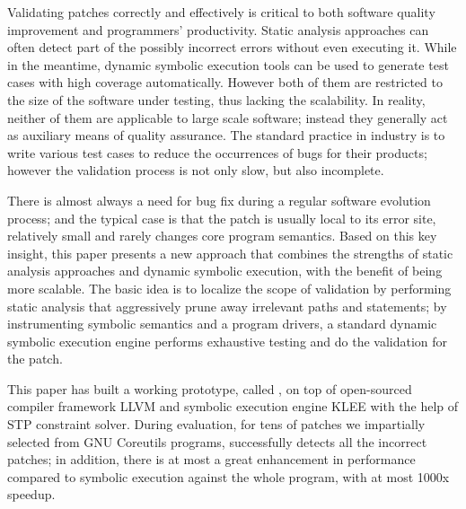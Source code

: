 \begin{englishabstract}
Validating patches correctly and effectively is critical to both software quality improvement and programmers' productivity. Static analysis approaches can often detect part of the possibly incorrect errors without even executing it. While in the meantime, dynamic symbolic execution tools can be used to generate test cases with high coverage automatically. However both of them are restricted to the size of the software under testing, thus lacking the scalability. In reality, neither of them are applicable to large scale software; instead they generally act as auxiliary means of quality assurance. The standard practice in industry is to write various test cases to reduce the occurrences of bugs for their products; however the validation process is not only slow, but also incomplete.

There is almost always a need for bug fix during a regular software evolution process; and the typical case is that the patch is usually local to its error site, relatively small and rarely changes core program semantics. Based on this key insight, this paper presents a new approach that combines the strengths of static analysis approaches and dynamic symbolic execution, with the benefit of being more scalable. The basic idea is to localize the scope of validation by performing static analysis that aggressively prune away irrelevant paths and statements; by instrumenting symbolic semantics and a program drivers, a standard dynamic symbolic execution engine performs exhaustive testing and do the validation for the patch. 

This paper has built a working prototype, called {\dryrun}, on top of open-sourced compiler framework LLVM and symbolic execution engine KLEE with the help of STP constraint solver. During evaluation, for tens of patches we impartially selected from GNU Coreutils programs, {\dryrun} successfully detects all the incorrect patches; in addition, there is at most a great enhancement in performance compared to symbolic execution against the whole program, with at most 1000x speedup.

\end{englishabstract}
